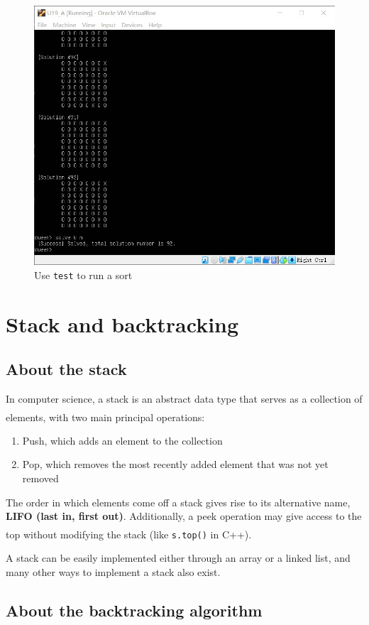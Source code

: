 \documentclass[cn,black,12pt,normal]{elegantnote}
\newcommand{\uct}[1]{\textsuperscript{\textsuperscript{\cite{#1}}}}
\begin{document}
\begin{figure}[H]
    \centering
    \includegraphics[width=0.7\linewidth]{image/queen_02.jpg}
    \caption{Use \lstinline{test} to run a sort}
\end{figure}

\section{Stack and backtracking}

\subsection{About the stack}

In computer science, a stack is an abstract data type that serves as a collection of elements, with two main principal operations\uct{wiki:Stack_(abstract_data_type)}:
\begin{enumerate}
    \item Push, which adds an element to the collection
    \item Pop, which removes the most recently added element that was not yet removed
\end{enumerate}

The order in which elements come off a stack gives rise to its alternative name, \textbf{LIFO (last in, first out)}. Additionally, a peek operation may give access to the top without modifying the stack (like \lstinline{s.top()} in C++).\uct{wiki:Stack_(abstract_data_type)}

A stack can be easily implemented either through an array or a linked list, and many other ways to implement a stack also exist.

\subsection{About the backtracking algorithm}
\end{document}
